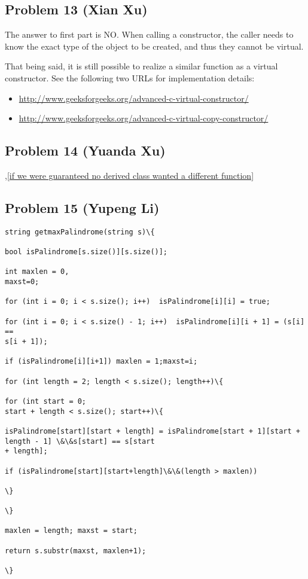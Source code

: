 \documentclass[10pt]{article}
\begin{document}
\subsection*{Problem 13 (Xian Xu)}
The answer to first part is NO. When calling a constructor, the caller needs to know the exact type of the object to be created, and thus they
cannot be virtual.

That being said, it is still possible to realize a similar function as a virtual constructor. See the following
two URLs for implementation details: 

\begin{itemize}
\item
\url{http://www.geeksforgeeks.org/advanced-c-virtual-constructor/}

\item
\url{http://www.geeksforgeeks.org/advanced-c-virtual-copy-constructor/}
\end{itemize}

\subsection*{Problem 14 (Yuanda Xu)}
,\ref{if we were guaranteed no derived class wanted a different function}

\subsection*{Problem 15 (Yupeng Li)}
\begin{lstlisting}string getmaxPalindrome(string s)\{

bool isPalindrome[s.size()][s.size()];

int maxlen = 0,
maxst=0;

for (int i = 0; i < s.size(); i++)  isPalindrome[i][i] = true;

for (int i = 0; i < s.size() - 1; i++)  isPalindrome[i][i + 1] = (s[i] ==
s[i + 1]);

if (isPalindrome[i][i+1]) maxlen = 1;maxst=i;

for (int length = 2; length < s.size(); length++)\{

for (int start = 0;
start + length < s.size(); start++)\{

isPalindrome[start][start + length] = isPalindrome[start + 1][start + length - 1] \&\&s[start] == s[start
+ length];

if (isPalindrome[start][start+length]\&\&(length > maxlen))

\}

\}

maxlen = length; maxst = start;

return s.substr(maxst, maxlen+1);

\}

\end{lstlisting}
\end{document}

